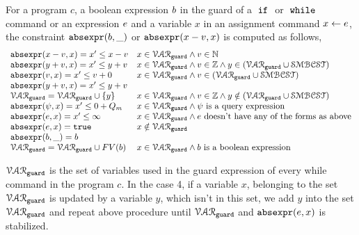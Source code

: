 \begin{defn}
  \label{def:constraint_compute}
  For a program $c$, a boolean expression $b$ in the guard of a $\;\mathtt{if}\;$ or $\;\mathtt{while}\;$ command
  or an expression $e$ and a variable $x$
  in an assignment command $\mathrel{ x \leftarrow e }$,
  the constraint $\mathtt{abs}{\mathtt{expr}}(b, \_)$ or $\mathtt{abs}{\mathtt{expr}}(x - v, x)$ is computed as follows,
  \[
    \begin{array}{ll} 
      \mathtt{abs}{\mathtt{expr}}(x - v, x)  = x' \leq x - v  & x \in \mathcal{VAR}_{\mathtt{guard}} \land v \in \mathbb{N} \\
      \mathtt{abs}{\mathtt{expr}}(y + v, x)  = x' \leq y + v  & x \in \mathcal{VAR}_{\mathtt{guard}} \land v \in \mathbb{Z} \land y \in (\mathcal{VAR}_{\mathtt{guard}} \cup \mathcal{SMBCST}) \\
      \mathtt{abs}{\mathtt{expr}}(v, x)  = x' \leq v + 0  & x \in \mathcal{VAR}_{\mathtt{guard}} \land v \in (\mathcal{VAR}_{\mathtt{guard}} \cup \mathcal{SMBCST}) \\
      \mathtt{abs}{\mathtt{expr}}(y + v, x)  = x' \leq y + v & \\
      \mathcal{VAR}_{\mathtt{guard}} = \mathcal{VAR}_{\mathtt{guard}} \cup \{y\} & x \in \mathcal{VAR}_{\mathtt{guard}} \land v \in \mathbb{Z} \land y \notin (\mathcal{VAR}_{\mathtt{guard}} \cup \mathcal{SMBCST})  \\
      \mathtt{abs}{\mathtt{expr}}(\psi, x)  = x' \leq 0 + Q_m & x \in \mathcal{VAR}_{\mathtt{guard}} \land \psi \text{ is a query expression}  \\
      \mathtt{abs}{\mathtt{expr}}(e, x) = x' \leq \infty  &  x \in \mathcal{VAR}_{\mathtt{guard}} \land e \text{ doesn't have any of the forms as above} \\
      \mathtt{abs}{\mathtt{expr}}(e, x) = \mathtt{true}  &  x \notin \mathcal{VAR}_{\mathtt{guard}} \\
      \mathtt{abs}{\mathtt{expr}}(b, \_) = b   & \\
      \mathcal{VAR}_{\mathtt{guard}} = \mathcal{VAR}_{\mathtt{guard}} \cup FV(b) &  x \in \mathcal{VAR}_{\mathtt{guard}} \land b \text{ is a boolean expression} \\
    \end{array}
    \]
  \end{defn}
%
  $\mathcal{VAR}_{\mathtt{guard}}$ is the set of variables used in the guard expression of every while command in the program $c$. 
  In the case 4, if a variable $x$, belonging to the set 
  $\mathcal{VAR}_{\mathtt{guard}}$ is updated by a variable $y$, which isn't in this set, 
  we add $y$ into the set $\mathcal{VAR}_{\mathtt{guard}}$ and repeat 
  above procedure  until $\mathcal{VAR}_{\mathtt{guard}}$ and $\mathtt{abs}{\mathtt{expr}}(e, x)$ is stabilized. 

